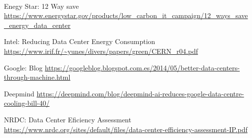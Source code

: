 \documentclass[10pt]{article}
\begin{document}
    	\paragraph{}
	\clearpage 	
    \begin{thebibliography}{9}
        
  		Enegy Star: 12 Way save \url{https://www.energystar.gov/products/low_carbon_it_campaign/12_ways_save_energy_data_center}
        
        Intel: Reducing Data Center Energy Consumption \url{https://www.irif.fr/~yunes/divers/papers/green/CERN_r04.pdf}
        
        Google: Blog \url{https://googleblog.blogspot.com.es/2014/05/better-data-centers-through-machine.html}
        
        Deepmind \url{https://deepmind.com/blog/deepmind-ai-reduces-google-data-centre-cooling-bill-40/}
        
        NRDC: Data Center Eficiency Assessment \url{https://www.nrdc.org/sites/default/files/data-center-efficiency-assessment-IP.pdf}
        
	\end{thebibliography}
  		
\end{document}
